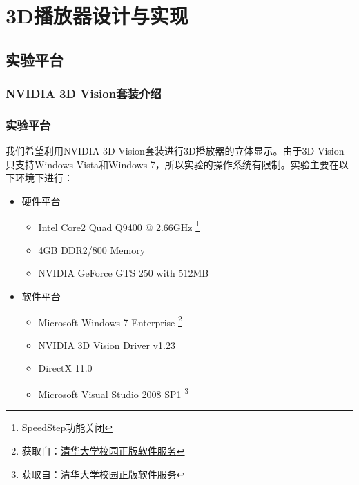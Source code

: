 

\chapter{3D播放器设计与实现}
\label{cha:3Dplayerdesignandrealization}

\section{实验平台}
\label{sec:3dplayerhardwareplatform}

\subsection{NVIDIA 3D Vision套装介绍}
\label{subsec:nvidia3dvisionbrief}


\subsection{实验平台}
\label{subsec:3dplayerplatform}
我们希望利用NVIDIA 3D Vision套装进行3D播放器的立体显示。由于3D Vision只支持Windows Vista和Windows 7，所以实验的操作系统有限制。实验主要在以下环境下进行：

\begin{itemize}
\item {硬件平台}

\begin{itemize}
\item Intel Core2 Quad Q9400 @ 2.66GHz
	\footnote{SpeedStep功能关闭}
\item 4GB DDR2/800 Memory
\item NVIDIA GeForce GTS 250 with 512MB
\end{itemize}

\item {软件平台}

\begin{itemize}
\item Microsoft Windows 7 Enterprise
	\footnote{获取自：\href{http://helpdesk.tsinghua.edu.cn/yhfw/yhfw_zbrj_tz.jsp}{清华大学校园正版软件服务}}
\item NVIDIA 3D Vision Driver v1.23
\item DirectX 11.0
\item Microsoft Visual Studio 2008 SP1
	\footnote{获取自：\href{http://helpdesk.tsinghua.edu.cn/yhfw/yhfw_zbrj_tz.jsp}{清华大学校园正版软件服务}}
\end{itemize}

\end{itemize}


